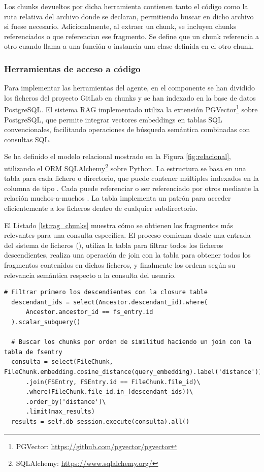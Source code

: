 Los chunks devueltos por dicha herramienta contienen tanto el código como la ruta relativa del archivo donde se declaran, permitiendo buscar en dicho archivo si fuese necesario. Adicionalmente, al extraer un chunk, se incluyen chunks referenciados o que referencian ese fragmento. Se define que un chunk referencia a otro cuando llama a una función o instancia una clase definida en el otro chunk. 

\subsubsection{Herramientas de acceso a código}
\label{sec:herramientas_codigo}
Para implementar las herramientas del agente, en el componente  se han dividido los ficheros del proyecto GitLab en chunks y se han indexado en la base de datos PostgreSQL. El sistema RAG implementado utiliza la extensión PGVector\footnote{PGVector: \url{https://github.com/pgvector/pgvector}} sobre PostgreSQL, que permite integrar vectores embeddings en tablas SQL convencionales, facilitando operaciones de búsqueda semántica combinadas con consultas SQL. 

Se ha definido el modelo relacional mostrado en la Figura \ref{fig:relacional}, utilizando el ORM SQLAlchemy\footnote{SQLAlchemy: \url{https://www.sqlalchemy.org/}} sobre Python. La estructura se basa en una tabla  para cada fichero o directorio, que puede contener múltiples  indexados en la columna  de tipo . Cada  puede referenciar o ser referenciado por otros  mediante la relación muchos-a-muchos . La tabla  implementa un patrón  para acceder eficientemente a los ficheros dentro de cualquier subdirectorio.

El Listado \ref{lst:rag_chunks} muestra cómo se obtienen los fragmentos más relevantes para una consulta específica. El proceso comienza desde una entrada del sistema de ficheros (), utiliza la tabla  para filtrar todos los ficheros descendientes, realiza una operación de join con la tabla  para obtener todos los fragmentos contenidos en dichos ficheros, y finalmente los ordena según su relevancia semántica respecto a la consulta del usuario.

\begin{lstlisting}[caption={Obtener chunks relevantes para una consulta dentro de un subdirectorio específico}, label={lst:rag_chunks}]
  # Filtrar primero los descendientes con la closure table
  descendant_ids = select(Ancestor.descendant_id).where(
      Ancestor.ancestor_id == fs_entry.id
  ).scalar_subquery()

  # Buscar los chunks por orden de similitud haciendo un join con la tabla de fsentry
  consulta = select(FileChunk, FileChunk.embedding.cosine_distance(query_embedding).label('distance'))\
      .join(FSEntry, FSEntry.id == FileChunk.file_id)\
      .where(FileChunk.file_id.in_(descendant_ids))\
      .order_by('distance')\
      .limit(max_results)
  results = self.db_session.execute(consulta).all()
\end{lstlisting}


